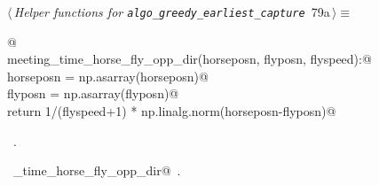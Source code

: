 \documentclass[11.5pt]{report}
\begin{document}
\begin{flushleft} \small
\begin{minipage}{\linewidth}\label{scrap119}\raggedright\small
{} $\langle\,${\itshape Helper functions for \verb|algo_greedy_earliest_capture|}\nobreak\ {\footnotesize {79a}}$\,\rangle\equiv$
\vspace{-1ex}
\begin{list}{}{} \item
\mbox{}\verb@   @\\
\mbox{}\verb@def meeting_time_horse_fly_opp_dir(horseposn, flyposn, flyspeed):@\\
\mbox{}\verb@    horseposn = np.asarray(horseposn)@\\
\mbox{}\verb@    flyposn   = np.asarray(flyposn)@\\
\mbox{}\verb@    return 1/(flyspeed+1) * np.linalg.norm(horseposn-flyposn)@\\
\mbox{}\verb@@{\NWsep}
\end{list}
\vspace{-1.5ex}
\footnotesize
\begin{list}{}{\setlength{\itemsep}{-\parsep}\setlength{\itemindent}{-\leftmargin}}
\item \NWtxtMacroRefIn\ .
\item \NWtxtIdentsDefed\nobreak\  \verb@meeting_time_horse_fly_opp_dir@\nobreak\ .
\item{}
\end{list}
\end{minipage}\vspace{4ex}
\end{flushleft}
\end{document}
